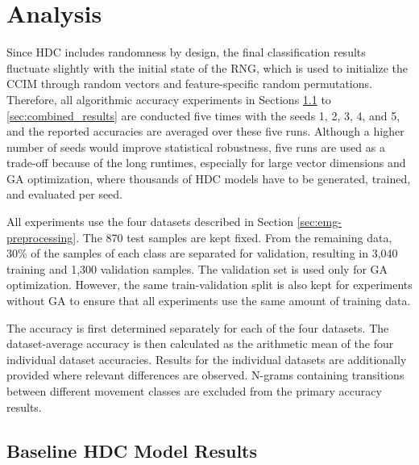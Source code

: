﻿\chapter{Analysis}
\label{Analyse}

Since HDC includes randomness by design, the final classification results fluctuate slightly with the initial state of the \ac{RNG}, which is used to initialize the CCIM through random vectors and feature-specific random permutations. Therefore, all algorithmic accuracy experiments in Sections \ref{sec:results_baseline} to \ref{sec:combined_results} are conducted five times with the seeds 1, 2, 3, 4, and 5, and the reported accuracies are averaged over these five runs. Although a higher number of seeds would improve statistical robustness, five runs are used as a trade-off because of the long runtimes, especially for large vector dimensions and GA optimization, where thousands of HDC models have to be generated, trained, and evaluated per seed.

All experiments use the four datasets described in Section \ref{sec:emg-preprocessing}. The 870 test samples are kept fixed. From the remaining data, 30\% of the samples of each class are separated for validation, resulting in 3,040 training and 1,300 validation samples. The validation set is used only for GA optimization. However, the same train-validation split is also kept for experiments without GA to ensure that all experiments use the same amount of training data.

The accuracy is first determined separately for each of the four datasets. The dataset-average accuracy is then calculated as the arithmetic mean of the four individual dataset accuracies. Results for the individual datasets are additionally provided where relevant differences are observed. N-grams containing transitions between different movement classes are excluded from the primary accuracy results.


\section{Baseline HDC Model Results}
\label{sec:results_baseline}

